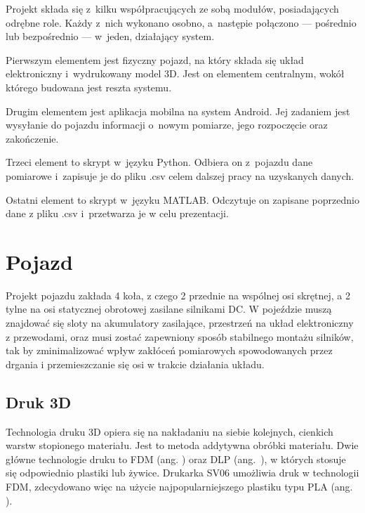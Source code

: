 \label{ch:project}

Projekt składa się z~kilku współpracujących ze sobą modułów, posiadających odrębne role. Każdy z~nich wykonano osobno, a~następie połączono --- pośrednio lub bezpośrednio --- w~jeden, działający system.

Pierwszym elementem jest fizyczny pojazd, na który składa się układ elektroniczny i~wydrukowany model 3D. Jest on elementem centralnym, wokół którego budowana jest reszta systemu.

Drugim elementem jest aplikacja mobilna na system Android. Jej zadaniem jest wysyłanie do pojazdu informacji o~nowym pomiarze, jego rozpoczęcie oraz zakończenie.

Trzeci element to skrypt w~języku Python. Odbiera on z~pojazdu dane pomiarowe i~zapisuje je do pliku .csv celem dalszej pracy na uzyskanych danych.

Ostatni element to skrypt w~języku MATLAB. Odczytuje on zapisane poprzednio dane z pliku .csv i~przetwarza je w celu prezentacji.

\section{Pojazd}
Projekt pojazdu zakłada 4 koła, z czego 2 przednie na wspólnej osi skrętnej, a 2 tylne na osi statycznej obrotowej zasilane silnikami DC. W pojeździe muszą znajdować się sloty na akumulatory zasilające, przestrzeń na układ elektroniczny z przewodami, oraz musi zostać zapewniony sposób stabilnego montażu silników, tak by zminimalizować wpływ zakłóceń pomiarowych spowodowanych przez drgania i przemieszczanie się osi w trakcie działania układu.

\subsection*{Druk 3D}
Technologia druku 3D opiera się na nakładaniu na siebie kolejnych, cienkich warstw stopionego materiału. Jest to metoda addytywna obróbki materiału. Dwie główne technologie druku to FDM (ang. ) oraz DLP (ang.~), w których stosuje się odpowiednio plastiki lub żywice\cite{bib:pracakrzysztofaserafina}. Drukarka SV06 umożliwia druk w technologii FDM, zdecydowano więc na użycie najpopularniejszego plastiku typu PLA (ang. ).

